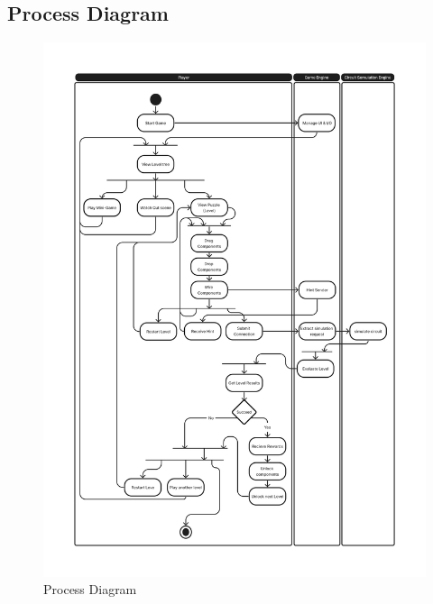 \documentclass[../main.tex]{subfiles}
\begin{document}
\newpage
\subsection{Process Diagram}
\begin{figure}[ht!]
\centering
\includegraphics[scale=0.27]{images/chapter3/Process.png}
\caption{Process Diagram}
\label{prcess.png}
\end{figure}
\vfill

\newpage
\end{document}
